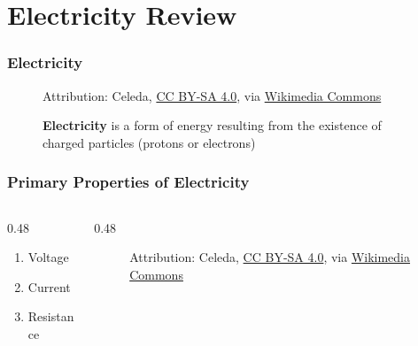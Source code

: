 \section{Electricity Review}

\begin{frame}
    \frametitle{Electricity}
    \begin{figure}
        \centering

        
        {\tiny Attribution: Celeda, \href{https://creativecommons.org/licenses/by-sa/4.0}{CC BY-SA 4.0}, via \href{https://commons.wikimedia.org/wiki/File:Arc_\%C3\%A9lectrique_double.jpg}{Wikimedia Commons}\par}
        {\footnotesize \textbf{Electricity} is a form of energy resulting from the existence of charged particles (protons or electrons)\par}
    \end{figure}
\end{frame}

\begin{frame}
    \frametitle{Primary Properties of Electricity}
	\begin{columns}
	\begin{column}{0.48\linewidth}
        \begin{enumerate}[<+- | alert@+>]
            \item{Voltage}
            \item{Current}
            \item{Resistance}
        \end{enumerate}
	\end{column}
	\begin{column}{0.48\linewidth}
		\begin{figure}
            \centering

            {\tiny Attribution: Celeda, \href{https://creativecommons.org/licenses/by-sa/4.0}{CC BY-SA 4.0}, via \href{https://commons.wikimedia.org/wiki/File:Arc_\%C3\%A9lectrique_double.jpg}{Wikimedia Commons}\par}
        \end{figure}
	\end{column}
	\end{columns}
\end{frame}

